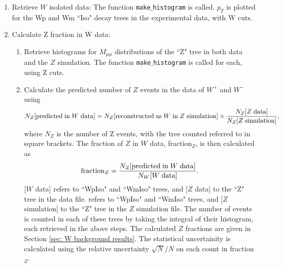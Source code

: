 \documentclass[a4paper]{article}
\begin{document}
\begin{enumerate}
    \item Retrieve $W$ isolated data: The function \texttt{make$\_$histogram} is called. $p_T$ is plotted for the Wp and Wm ``Iso" decay trees in the experimental data, with W cuts.
    
    \item Calculate Z fraction in W data:
    \begin{enumerate}
        \item Retrieve histograms for $M_{\mu\mu}$ distributions of the ``Z" tree in both data and the $Z$ simulation. The function \texttt{make$\_$histogram} is called for each, using Z cuts.
        \item Calculate the predicted number of $Z$ events in the data of $W^+$ and $W^-$ using
        \begin{equation}
            N_Z[{\rm predicted \; in \;} W {\rm\; data}] = N_Z[{\rm reconstructed \; as \;} W {\rm \; in \;} Z {\rm \; simulation}] \times \frac{N_Z[Z {\rm \; data}]}{N_Z[Z {\rm\; simulation}]},
        \end{equation}
        where $N_Z$ is the number of Z events, with the tree counted referred to in square brackets. The fraction of $Z$ in $W$ data, fraction$_Z$, is then calculated as
        \begin{equation}
            {\rm fraction}_Z = \frac{N_Z[{\rm predicted \; in \;} W {\rm\; data}]}{N_W[W {\rm \; data}]}.
        \end{equation}
        [$W$ data] refers to ``WpIso" and ``WmIso" trees, and [$Z$ data] to the ``Z" tree in the data file.  refers to ``WpIso" and ``WmIso" trees, and [$Z$ simulation] to the ``Z" tree in the $Z$ simulation file. \newline 
        The number of events is counted in each of these trees by taking the integral of their histogram, each retrieved in the above steps. \newline
        The calculated $Z$ fractions are given in Section \ref{sec: W background results}.
        The statistical uncertainity is calculated using the relative uncertainty $\sqrt{N}/N$ on each count in fraction$_Z$.
    \end{enumerate}
    

\end{enumerate}
\end{document}
